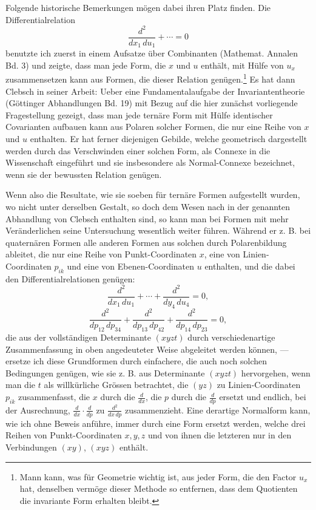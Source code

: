 \documentclass[10pt]{article}
\begin{document}
Folgende historische Bemerkungen mögen dabei ihren Platz finden. Die Differentialrelation
\[
\frac{d^2}{dx_1\,du_1}+\cdots=0
\]
benutzte ich zuerst in einem Aufsatze über Combinanten (Mathemat. Annalen Bd. 3) und zeigte, dass man jede Form, die $x$ und $u$ enthält, mit Hülfe von $u_x$ zusammensetzen kann aus Formen, die dieser Relation genügen.\footnote{Mann kann, was für Geometrie wichtig ist, aus jeder Form, die den Factor $u_x$ hat, denselben vermöge dieser Methode so entfernen, dass dem Quotienten die invariante Form erhalten bleibt.} Es hat dann Clebsch in seiner Arbeit: Ueber eine Fundamentalaufgabe der Invariantentheorie (Göttinger Abhandlungen Bd. 19) mit Bezug auf die hier zunächst vorliegende Fragestellung gezeigt, dass man jede ternäre Form mit Hülfe identischer Covarianten aufbauen kann aus Polaren solcher Formen, die nur eine Reihe von $x$ und $u$ enthalten. Er hat ferner diejenigen Gebilde, welche geometrisch dargestellt werden durch das Verschwinden einer solchen Form, als Connexe in die Wissenschaft eingeführt und sie insbesondere als Normal-Connexe bezeichnet, wenn sie der bewussten Relation genügen.

Wenn also die Resultate, wie sie soeben für ternäre Formen aufgestellt wurden, wo nicht unter derselben Gestalt, so doch dem Wesen nach in der genannten Abhandlung von Clebsch enthalten sind, so kann man bei Formen mit mehr Veränderlichen seine Untersuchung wesentlich weiter führen. Während er z. B. bei quaternären Formen alle anderen Formen aus solchen durch Polarenbildung ableitet, die nur eine Reihe von Punkt-Coordinaten $x$, eine von Linien-Coordinaten $p_{ik}$ und eine von Ebenen-Coordinaten $u$ enthalten, und die dabei den Differentialrelationen genügen:
\[
\frac{d^2}{dx_1\,du_1}+\cdots+\frac{d^2}{dy_4\,du_4}=0,
\]
\[
\frac{d^2}{dp_{12}\,dp_{34}}+
\frac{d^2}{dp_{13}\,dp_{42}}+
\frac{d^2}{dp_{14}\,dp_{23}}=0,
\]
die aus der vollständigen Determinante $(xyzt)$ durch verschiedenartige Zusammenfassung in oben angedeuteter Weise abgeleitet werden können, --- ersetze ich diese Grundformen durch einfachere, die auch noch solchen Bedingungen genügen, wie sie z. B. aus Determinante $(xyzt)$ hervorgehen, wenn man die $t$ als willkürliche Grössen betrachtet, die $(yz)$ zu Linien-Coordinaten $p_{ik}$ zusammenfasst, die $x$ durch die $\frac d{dx}$, die $p$ durch die $\frac d{dp}$ ersetzt und endlich, bei der Ausrechnung, $\frac d{dx}\cdot\frac d{dp}$ zu $\frac{d^2}{dx\,dp}$ zusammenzieht. Eine derartige Normalform kann, wie ich ohne Beweis anführe, immer durch eine Form ersetzt werden, welche drei Reihen von Punkt-Coordinaten $x,y,z$ und von ihnen die letzteren nur in den Verbindungen $(xy)$, $(xyz)$ enthält.
\end{document}
